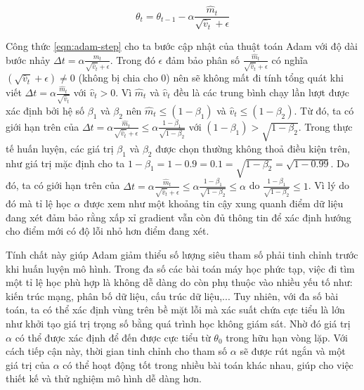 \begin{equation}
	\label{eqn:adam-step}
	\theta_t = \theta_{t-1} - \alpha \frac{\hat m_t}{\sqrt{\hat v_t} + \epsilon}
\end{equation}

Công thức \ref{eqn:adam-step} cho ta bước cập nhật của thuật toán Adam với độ dài bước nhảy $\Delta t = \alpha \frac{\hat m_t}{\sqrt{\hat v_t} + \epsilon}$. Trong đó $\epsilon$ đảm bảo phân số $\frac{\hat m_t}{\sqrt{\hat v_t} + \epsilon}$ có nghĩa $(\sqrt{\hat v_t} + \epsilon) \neq 0$ (không bị chia cho 0) nên sẽ không mất đi tính tổng quát khi viết $\Delta t = \alpha \frac{\hat m_t}{\sqrt{\hat v_t}}$ với $\hat v_t > 0$. Vì $\hat m_t$ và $\hat v_t$ đều là các trung bình chạy lần lượt được xác định bởi hệ số $\beta_1$ và $\beta_2$ nên $\hat m_t \leq (1-\beta_1)$ và $\hat v_t \leq (1-\beta_2)$. Từ đó, ta có giới hạn trên của $\Delta t = \alpha \frac{\hat m_t}{\sqrt{\hat v_t} + \epsilon} \leq \alpha \frac{1 - \beta_1}{\sqrt{1 - \beta_2}}$ với $(1 - \beta_1) > \sqrt{1-\beta_2}$. Trong thực tế huấn luyện, các giá trị $\beta_1$ và $\beta_2$ được chọn thường không thoả điều kiện trên, như giá trị mặc định cho ta $1 - \beta_1 = 1 - 0.9 = 0.1 =\sqrt{1-\beta_2} = \sqrt{1-0.99}$. Do đó, ta có giới hạn trên của $\Delta t = \alpha \frac{\hat m_t}{\sqrt{\hat v_t} + \epsilon} \leq \alpha \frac{1 - \beta_1}{\sqrt{1 - \beta_2}} \leq \alpha$ do $\frac{1 - \beta_1}{\sqrt{1 - \beta_2}} \leq 1$. Vì lý do đó mà tỉ lệ học $\alpha$ được xem như một khoảng tin cậy xung quanh điểm dữ liệu đang xét đảm bảo rằng xấp xỉ gradient vẫn còn đủ thông tin để xác định hướng cho điểm mới có độ lỗi nhỏ hơn điểm đang xét.

Tính chất này giúp Adam giảm thiểu số lượng siêu tham số phải tinh chỉnh trước khi huấn luyện mô hình. Trong đa số các bài toán máy học phức tạp, việc đi tìm một tỉ lệ học phù hợp là không dễ dàng do còn phụ thuộc vào nhiều yếu tố như: kiến trúc mạng, phân bố dữ liệu, cấu trúc dữ liệu,... Tuy nhiên, với đa số bài toán, ta có thể xác định vùng trên bề mặt lỗi mà xác suất chứa cực tiểu là lớn như khởi tạo giá trị trọng số bằng quá trình học không giám sát. Nhờ đó giá trị $\alpha$ có thể được xác định để đến được cực tiểu từ $\theta_0$ trong hữu hạn vòng lặp. Với cách tiếp cận này, thời gian tinh chỉnh cho tham số $\alpha$ sẽ được rút ngắn và một giá trị của $\alpha$ có thể hoạt động tốt trong nhiều bài toán khác nhau, giúp cho việc thiết kế và thử nghiệm mô hình dễ dàng hơn.

